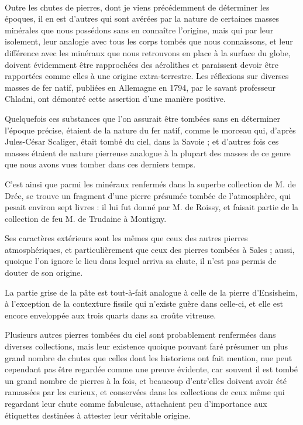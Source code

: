 \documentclass[a4paper, 12pt, oneside, french]{article}
\begin{document}
\paragraph{}
Outre les chutes de pierres, dont je viens précédemment de déterminer les époques, il en est d'autres qui sont avérées par la nature de certaines masses minérales que nous possédons sans en connaître l'origine, mais qui par leur isolement, leur analogie avec tous les corps tombés que nous connaissons, et leur différence avec les minéraux que nous retrouvons en place à la surface du globe, doivent évidemment être rapprochées des aérolithes et paraissent devoir être rapportées comme elles à une origine extra-terrestre. Les réflexions sur diverses masses de fer natif, publiées en Allemagne en 1794, par le savant professeur Chladni, ont démontré cette assertion d'une manière positive.

Quelquefois ces substances que l'on assurait être tombées sans en déterminer l'époque précise, étaient de la nature du fer natif, comme le morceau qui, d'après Jules-César Scaliger, était tombé du ciel, dans la Savoie ; et d'autres fois ces masses étaient de nature pierreuse analogue à la plupart des masses de ce genre que nous avons vues tomber dans ces derniers temps.

C'est ainsi que parmi les minéraux renfermés dans la superbe collection de M. de Drée, se trouve un fragment d'une pierre présumée tombée de l'atmosphère, qui pesait environ sept livres : il lui fut donné par M. de Roissy, et faisait partie de la collection de feu M. de Trudaine à Montigny.

Ses caractères extérieurs sont les mêmes que ceux des autres pierres atmosphériques, et particulièrement que ceux des pierres tombées à Sales ; aussi, quoique l'on ignore le lieu dans lequel arriva sa chute, il n'est pas permis de douter de son origine.

La partie grise de la pâte est tout-à-fait analogue à celle de la pierre d'Ensisheim, à l'exception de la contexture fissile qui n'existe guère dans celle-ci, et elle est encore enveloppée aux trois quarts dans sa croûte vitreuse.

Plusieurs autres pierres tombées du ciel sont probablement renfermées dans diverses collections, mais leur existence quoique pouvant faré présumer un plus grand nombre de chutes que celles dont les historiens ont fait mention, nue peut cependant pas être regardée comme une preuve évidente, car souvent il est tombé un grand nombre de pierres à la fois, et beaucoup d'entr'elles doivent avoir été ramassées par les curieux, et conservées dans les collections de ceux même qui regardant leur chute comme fabuleuse, attachaient peu d'importance aux étiquettes destinées à attester leur véritable origine.
\end{document}

